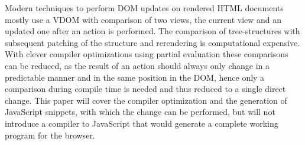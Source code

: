 Modern techniques to perform DOM updates on rendered HTML documents mostly use a VDOM with comparison of two views, the current view and an updated one after an action is performed. The comparison of tree-structures with subsequent patching of the structure and rerendering is computational expensive. With clever compiler optimizations using partial evaluation these comparisons can be reduced, as the result of an action should always only change in a predictable manner and in the same position in the DOM, hence only a comparison during compile time is needed and thus reduced to a single direct change.
This paper will cover the compiler optimization and the generation of JavaScript snippets, with which the change can be performed, but will not introduce a compiler to JavaScript that would generate a complete working program for the browser.
